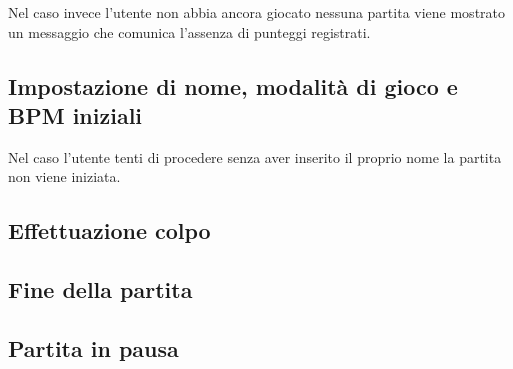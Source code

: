             Nel caso invece l'utente non abbia ancora giocato nessuna partita viene mostrato un messaggio che comunica l'assenza di punteggi registrati.
            \begin{figure}[h!]
            \end{figure}
            
        \newpage
        \subsection{Impostazione di nome, modalità di gioco e BPM iniziali}
            \begin{figure}[h!]
            \end{figure}
            
            Nel caso l'utente tenti di procedere senza aver inserito il proprio nome la partita non viene iniziata.
            \begin{figure}[h!]
            \end{figure}
            
        \newpage
        \subsection{Effettuazione colpo}
            \begin{figure}[h!]
            \end{figure}
        
        \subsection{Fine della partita}
            \begin{figure}[h!]
            \end{figure}
        
        \newpage    
        \subsection{Partita in pausa}
            \begin{figure}[h!]
            \end{figure}
        

